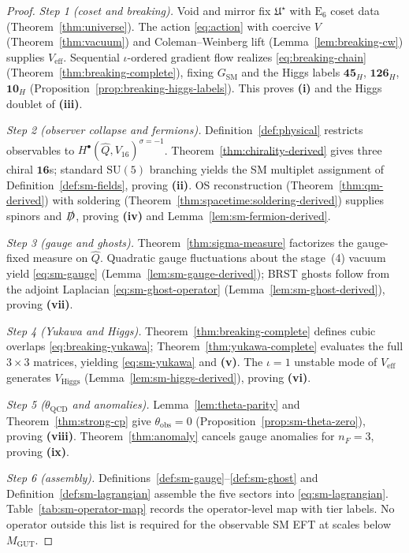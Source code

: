 \documentclass[11pt]{article}
\theoremstyle{plain}
\theoremstyle{definition}
\theoremstyle{remark}
\numberwithin{equation}{section}
\newcommand{\E}[1]{\mathrm{E}_{#1}}
\begin{document}
\begin{proof}
\emph{Step 1 (coset and breaking).}
Void and mirror fix $\mathfrak{U}^\star$ with $\E{6}$ coset data
(Theorem~\ref{thm:universe}). The action \eqref{eq:action} with coercive
$V$ (Theorem~\ref{thm:vacuum}) and Coleman--Weinberg lift
(Lemma~\ref{lem:breaking-cw}) supplies $V_{\mathrm{eff}}$. Sequential
$\iota$-ordered gradient flow realizes \eqref{eq:breaking-chain}
(Theorem~\ref{thm:breaking-complete}), fixing $G_{\mathrm{SM}}$ and the Higgs
labels $\mathbf{45}_H$, $\mathbf{126}_H$, $\mathbf{10}_H$
(Proposition~\ref{prop:breaking-higgs-labels}). This proves
\textbf{(i)} and the Higgs doublet of \textbf{(iii)}.

\emph{Step 2 (observer collapse and fermions).}
Definition~\ref{def:physical} restricts observables to
$H^\bullet(\hat Q,V_{16})^{\sigma=-1}$. Theorem~\ref{thm:chirality-derived}
gives three chiral $\mathbf{16}$s; standard $\mathrm{SU}(5)$ branching yields
the SM multiplet assignment of Definition~\ref{def:sm-fields}, proving
\textbf{(ii)}. OS reconstruction (Theorem~\ref{thm:qm-derived}) with soldering
(Theorem~\ref{thm:spacetime:soldering-derived}) supplies spinors and
$\slashed{D}$, proving \textbf{(iv)} and Lemma~\ref{lem:sm-fermion-derived}.

\emph{Step 3 (gauge and ghosts).}
Theorem~\ref{thm:sigma-measure} factorizes the gauge-fixed measure on
$\hat Q$. Quadratic gauge fluctuations about the stage~(4) vacuum yield
\eqref{eq:sm-gauge} (Lemma~\ref{lem:sm-gauge-derived}); BRST ghosts follow
from the adjoint Laplacian \eqref{eq:sm-ghost-operator}
(Lemma~\ref{lem:sm-ghost-derived}), proving \textbf{(vii)}.

\emph{Step 4 (Yukawa and Higgs).}
Theorem~\ref{thm:breaking-complete} defines cubic overlaps
\eqref{eq:breaking-yukawa}; Theorem~\ref{thm:yukawa-complete} evaluates the
full $3\times3$ matrices, yielding \eqref{eq:sm-yukawa} and \textbf{(v)}.
The $\iota=1$ unstable mode of $V_{\mathrm{eff}}$ generates
$V_{\mathrm{Higgs}}$ (Lemma~\ref{lem:sm-higgs-derived}), proving
\textbf{(vi)}.

\emph{Step 5 ($\theta_{\mathrm{QCD}}$ and anomalies).}
Lemma~\ref{lem:theta-parity} and Theorem~\ref{thm:strong-cp} give
$\theta_{\mathrm{obs}}=0$ (Proposition~\ref{prop:sm-theta-zero}), proving
\textbf{(viii)}. Theorem~\ref{thm:anomaly} cancels gauge anomalies for
$n_F=3$, proving \textbf{(ix)}.

\emph{Step 6 (assembly).}
Definitions~\ref{def:sm-gauge}--\ref{def:sm-ghost} and
Definition~\ref{def:sm-lagrangian} assemble the five sectors into
\eqref{eq:sm-lagrangian}. Table~\ref{tab:sm-operator-map} records the
operator-level map with tier labels. No operator outside this list is required
for the observable SM EFT at scales below $M_{\mathrm{GUT}}$.
\end{proof}
\end{document}
